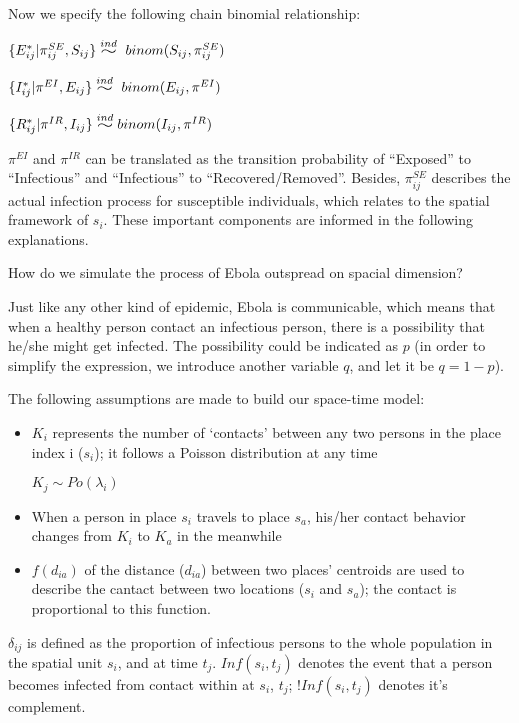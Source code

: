 \documentclass[11pt]{article}
\newcommand{\widesim}[2][1.5]{
      \mathrel{\overset{#2}{\scalebox{#1}[1]{$\sim$}}}
  }
\newcommand \mbreak {\\ \vspace{0.1in}}
\begin{document}
   Now we specify the following chain binomial relationship: 
    \vspace{0.15in}
    {

        
       { $\{E_{ij}^* | \pi^{SE}_{ij}, S_{ij} \} \widesim{ind}\ binom(S_{ij}, \pi^{SE}_{ij})$ }\mbreak

       { $\{I_{ij}^* | \pi^{EI}, E_{ij} \} \widesim{ind}\ binom(E_{ij}, \pi^{EI})$}\mbreak

       { $\{R_{ij}^* | \pi^{IR}, I_{ij} \} \widesim{ind} binom(I_{ij}, \pi^{IR})$}\mbreak
    }

$\pi^{EI}$ and $\pi^{IR}$ can be translated as the transition probability of ``Exposed'' to ``Infectious'' and ``Infectious'' to ``Recovered/Removed''. Besides, $\pi^{SE}_{ij}$ describes the actual infection process for susceptible individuals, which relates to the spatial framework of $ s_i $. These important components are informed in the following explanations.

How do we simulate the process of Ebola outspread on spacial dimension?

Just like any other kind of epidemic, Ebola is communicable, which means that when a healthy person contact an infectious person, there is a possibility that he/she might get infected. The possibility could be indicated as $p$ (in order to simplify the expression, we introduce another variable $q$, and let it be $q=1-p$).

The following assumptions are made to build our space-time model:

\begin{itemize}

    \item $K_i$ represents the number of `contacts' between any two persons in the place index i ($s_i$); it follows a Poisson distribution at any time
    \begin{center}
        $K_j \sim Po(\lambda_i)$
    \end{center}
    \item When a person in place $s_i$ travels to place $s_a$, his/her contact behavior changes from $K_i$ to $K_a$ in the meanwhile 
    \item $f(d_{ia})$ of the distance ($d_{ia}$) between two places' centroids are used to describe the cantact between two locations ($s_i$ and $s_a$); the contact is proportional to this function.

\end{itemize}

$\delta_{ij}$ is defined as the proportion of infectious persons to the whole population in the spatial unit $s_i$, and at time $t_j$. $Inf(s_i, t_j)$ denotes the event that a person becomes 
infected from contact within at $s_i$, $t_j$; $!Inf(s_i, t_j)$ denotes it's complement.
\end{document}
